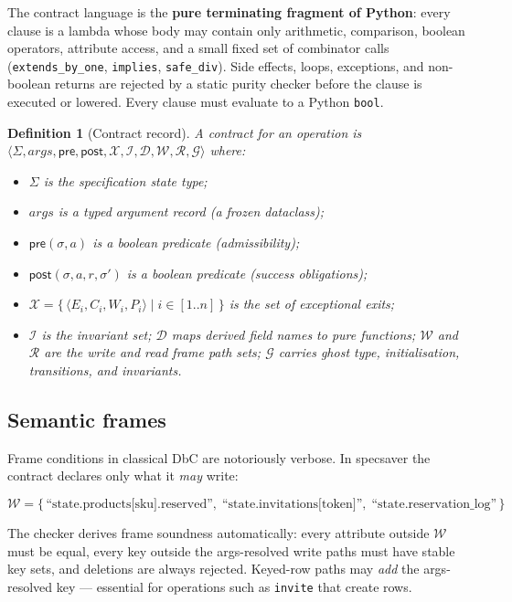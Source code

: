 \documentclass[11pt,a4paper]{article}
\newtheorem{definition}{Definition}
\begin{document}
The contract language is the \textbf{pure terminating fragment of
Python}: every clause is a lambda whose body may contain only
arithmetic, comparison, boolean operators, attribute access, and a
small fixed set of combinator calls (\texttt{extends\_by\_one},
\texttt{implies}, \texttt{safe\_div}).  Side effects, loops,
exceptions, and non-boolean returns are rejected by a static purity
checker before the clause is executed or lowered.  Every clause must
evaluate to a Python \texttt{bool}.

\begin{definition}[Contract record]\label{def:contract}
A contract for an operation is
$\langle \Sigma, \mathit{args}, \mathsf{pre}, \mathsf{post},
\mathcal{X}, \mathcal{I}, \mathcal{D}, \mathcal{W}, \mathcal{R},
\mathcal{G} \rangle$ where:
\begin{itemize}[nosep,leftmargin=*]
\item $\Sigma$ is the specification state type;
\item $\mathit{args}$ is a typed argument record (a frozen dataclass);
\item $\mathsf{pre}(\sigma, a)$ is a boolean predicate (admissibility);
\item $\mathsf{post}(\sigma, a, r, \sigma')$ is a boolean predicate
  (success obligations);
\item $\mathcal{X} = \{\,\langle E_i, C_i, W_i, P_i\rangle \mid i
  \in [1..n] \,\}$ is the set of exceptional exits;
\item $\mathcal{I}$ is the invariant set; $\mathcal{D}$ maps derived
  field names to pure functions; $\mathcal{W}$ and $\mathcal{R}$ are
  the write and read frame path sets; $\mathcal{G}$ carries ghost
  type, initialisation, transitions, and invariants.
\end{itemize}
\end{definition}

\subsection{Semantic frames}

Frame conditions in classical DbC are notoriously verbose.  In
\textsf{specsaver} the contract declares only what it \emph{may}
write:

\[
\mathcal{W} = \{\,
  \text{``state.products[sku].reserved''},\;
  \text{``state.invitations[token]''},\;
  \text{``state.reservation\_log''}
\,\}
\]

The checker derives frame soundness automatically: every attribute
outside $\mathcal{W}$ must be equal, every key outside the
args-resolved write paths must have stable key sets, and deletions are
always rejected.  Keyed-row paths may \emph{add} the args-resolved key
--- essential for operations such as \texttt{invite} that create rows.
\end{document}
